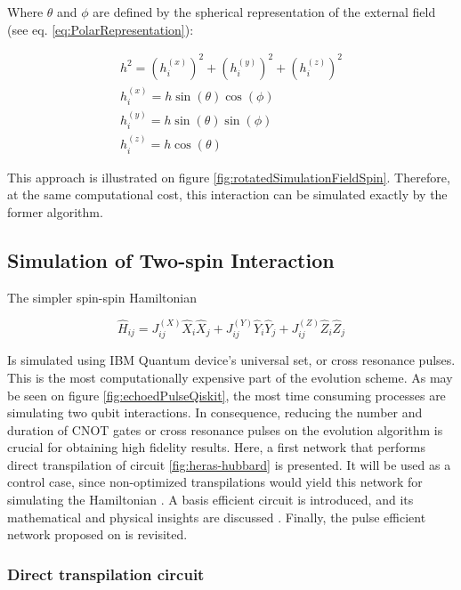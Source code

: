     Where $\theta$ and $\phi$ are defined by the spherical representation of the external field (see eq. \ref{eq:PolarRepresentation}):

    \begin{gather}
      h^2 =  (h_i^{(x)})^2 + (h_i^{(y)})^2 + (h_i^{(z)})^2 \\
      h_i^{(x)} = h \sin(\theta)\cos(\phi) \\
      h_i^{(y)} = h \sin(\theta)\sin(\phi) \\
      h_i^{(z)} = h \cos(\theta)
      \label{eq:PolarRepresentation}
    \end{gather}

    This approach is illustrated on figure \ref{fig:rotatedSimulationFieldSpin}. Therefore, at the same computational cost, this interaction can be simulated exactly by the former algorithm.

    

    \subsection{Simulation of Two-spin Interaction}

    The simpler spin-spin Hamiltonian

    \begin{equation}
      \hat{H}_{ij} = J_{ij}^{(X)} \hat{X}_i \hat{X}_j + J_{ij}^{(Y)} \hat{Y}_i \hat{Y}_j + J_{ij}^{(Z)} \hat{Z}_i \hat{Z}_j
      \label{eq:SpinSpin}
    \end{equation}

    Is simulated using IBM Quantum device's universal set, or cross resonance pulses. This is the most computationally expensive part of the evolution scheme. As may be seen on figure \ref{fig:echoedPulseQiskit}, the most time consuming processes are simulating two qubit interactions. In consequence, reducing the number and duration of CNOT gates or cross resonance pulses on the evolution algorithm is crucial for obtaining high fidelity results. Here, a first network that performs direct transpilation of circuit \ref{fig:heras-hubbard} is presented. It will be used as a control case, since non-optimized transpilations would yield this network for simulating the Hamiltonian \cite{Qiskit}. A basis efficient circuit is introduced, and its mathematical and physical insights are discussed \cite{BellUniversalCartan}. Finally, the pulse efficient network proposed on \cite{RXZPulseEfficient} is revisited.
  
  \subsubsection{Direct transpilation circuit}
  \label{subsec:DirectTranspilationCircuit}

